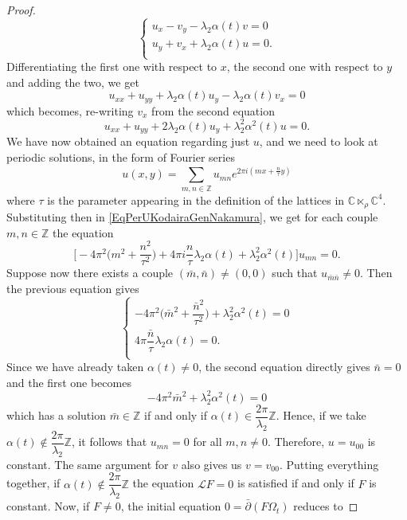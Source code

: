 \documentclass[a4paper, 11pt]{amsart}
\theoremstyle{plain}
\theoremstyle{definition}
\newcommand{\delbar}{\bar{\partial}}
\newcommand{\C}{\mathbb{C}}
\numberwithin{equation}{section}
\begin{document}
\begin{proof}
	\[ \begin{cases}
		u_{x} - v_{y} - \lambda_{2}\alpha(t)v = 0 \\
		u_{y} + v_{x} +\lambda_{2}\alpha(t)u = 0. \\
	\end{cases} \]
	Differentiating the first one with respect to $ x $, the second one with respect to $ y $ and adding the two, we get 
	\[ u_{xx} + u_{yy} + \lambda_{2}\alpha(t)u_{y} - \lambda_{2}\alpha(t)v_{x} = 0  \]
	which becomes, re-writing $ v_{x} $ from the second equation
	\begin{equation}\label{EqPerUKodairaGenNakamura}
		u_{xx} + u_{yy} + 2\lambda_{2}\alpha(t)u_{y} + \lambda_{2}^{2}\alpha^{2}(t)u = 0.
	\end{equation} 
	We have now obtained an equation regarding just $ u $, and we need to look at periodic solutions, in the form of Fourier series
	\[ u(x,y) = \sum_{m,n \in \mathbb{Z}}^{}u_{mn}e^{2\pi i(mx + \frac{n}{\tau}y)} \]
	where $\tau$ is the parameter appearing in the definition of the lattices in $ \C \ltimes_{\rho} \C^{4} $. Substituting then in \eqref{EqPerUKodairaGenNakamura}, we get for each couple $ m,n \in \mathbb{Z} $ the equation
	\[ \bigg[-4\pi^{2}\bigg(m^{2} + \dfrac{n^{2}}{\tau^{2}}\bigg) + 4\pi i\dfrac{n}{\tau}\lambda_{2}\alpha(t) +  \lambda_{2}^{2}\alpha^{2}(t)\bigg]u_{mn} = 0. \]
	Suppose now there exists a couple $ (\bar m, \bar n) \ne (0,0) $ such that $ u_{\bar m \bar n} \ne 0 $. Then the previous equation gives
	\[ \begin{cases}
		-4\pi^{2}\bigg(\bar m^{2} + \dfrac{\bar n^{2}}{\tau^{2}}\bigg) + \lambda_{2}^{2}\alpha^{2}(t) = 0 \\[8pt]
		4\pi \dfrac{\bar n}{\tau}\lambda_{2}\alpha(t) = 0. \\
	\end{cases} \]
	Since we have already taken $ \alpha(t) \ne 0 $, the second equation directly gives $ \bar n  = 0$ and the first one becomes
	\[ -4\pi^{2}\bar m^{2} + \lambda_{2}^{2}\alpha^{2}(t) = 0 \]
	which has a solution $ \bar m \in \mathbb{Z} $ if and only if $ \alpha(t) \in  \dfrac{2\pi}{\lambda_{2}}\mathbb{Z} $. Hence, if we take $ \alpha(t) \notin  \dfrac{2\pi}{\lambda_{2}}\mathbb{Z} $, it follows that $ u_{mn} = 0 $ for all $ m,n \ne 0 $. Therefore, $ u = u_{00} $ is constant. The same argument for $ v $ also gives us $ v = v_{00} $. Putting everything together, if $  \alpha(t) \notin  \dfrac{2\pi}{\lambda_{2}}\mathbb{Z}  $ the equation $ \mathcal{L}F = 0 $ is satisfied if and only if $ F $ is constant. Now, if $ F \ne 0 $, the initial equation $ 0 = \delbar(F\Omega_{t}) $ reduces to

\end{proof}
\end{document}
